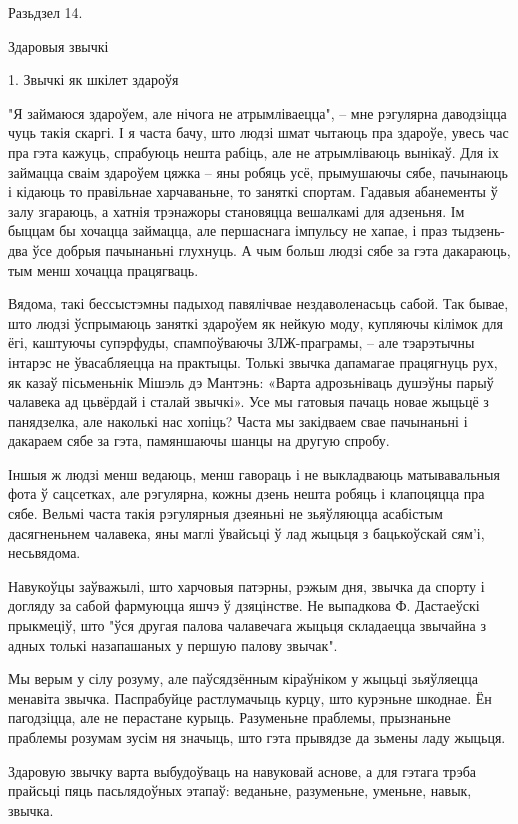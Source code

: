 Разьдзел 14. 

Здаровыя звычкі

1. Звычкі як шкілет здароўя

"Я займаюся здароўем, але нічога не атрымліваецца", – мне рэгулярна даводзіцца чуць такія скаргі. І я часта бачу, што людзі шмат чытаюць пра здароўе, увесь час пра гэта кажуць, спрабуюць нешта рабіць, але не атрымліваюць вынікаў. Для іх займацца сваім здароўем цяжка – яны робяць усё, прымушаючы сябе, пачынаюць і кідаюць то правільнае харчаваньне, то заняткі спортам. Гадавыя абанементы ў залу згараюць, а хатнія трэнажоры становяцца вешалкамі для адзеньня. Ім быццам бы хочацца займацца, але першаснага імпульсу не хапае, і праз тыдзень-два ўсе добрыя пачынаньні глухнуць. А чым больш людзі сябе за гэта дакараюць, тым менш хочацца працягваць.

Вядома, такі бессыстэмны падыход павялічвае нездаволенасьць сабой. Так бывае, што людзі ўспрымаюць заняткі здароўем як нейкую моду, купляючы кілімок для ёгі, каштуючы супэрфуды, спампоўваючы ЗЛЖ-праграмы, – але тэарэтычны інтарэс не ўвасабляецца на практыцы. Толькі звычка дапамагае працягнуць рух, як казаў пісьменьнік Мішэль дэ Мантэнь: «Варта адрозьніваць душэўны парыў чалавека ад цьвёрдай і сталай звычкі». Усе мы гатовыя пачаць новае жыцьцё з панядзелка, але наколькі нас хопіць? Часта мы закідваем свае пачынаньні і дакараем сябе за гэта, памяншаючы шанцы на другую спробу.

Іншыя ж людзі менш ведаюць, менш гавораць і не выкладваюць матывавальныя фота ў сацсетках, але рэгулярна, кожны дзень нешта робяць і клапоцяцца пра сябе. Вельмі часта такія рэгулярныя дзеяньні не зьяўляюцца асабістым дасягненьнем чалавека, яны маглі ўвайсьці ў лад жыцьця з бацькоўскай сям'і, несьвядома.

Навукоўцы заўважылі, што харчовыя патэрны, рэжым дня, звычка да спорту і догляду за сабой фармуюцца яшчэ ў дзяцінстве. Не выпадкова Ф. Дастаеўскі прыкмеціў, што "ўся другая палова чалавечага жыцьця складаецца звычайна з адных толькі назапашаных у першую палову звычак".

Мы верым у сілу розуму, але паўсядзённым кіраўніком у жыцьці зьяўляецца менавіта звычка. Паспрабуйце растлумачыць курцу, што курэньне шкоднае. Ён пагодзіцца, але не перастане курыць. Разуменьне праблемы, прызнаньне праблемы розумам зусім ня значыць, што гэта прывядзе да зьмены ладу жыцьця.

Здаровую звычку варта выбудоўваць на навуковай аснове, а для гэтага трэба прайсьці пяць пасьлядоўных этапаў: веданьне, разуменьне, уменьне, навык, звычка.

